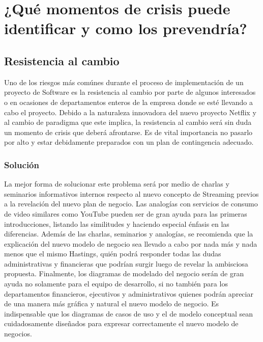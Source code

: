 \documentclass{article}
\begin{document}
\section{¿Qué momentos de crisis puede identificar y como los
prevendría?}
\subsection{Resistencia al cambio}
Uno de los riesgos más comúnes durante el proceso de implementación
de un proyecto de Software es la resistencia al cambio por parte
de algunos interesados o en ocasiones de departamentos enteros
de la empresa donde se esté llevando a cabo el proyecto. Debido
a la naturaleza innovadora del nuevo proyecto Netflix y al cambio
de paradigma que este implica, la resistencia al cambio será sin
duda un momento de crisis que deberá afrontarse. Es de vital
importancia no pasarlo por alto y estar debidamente preparados con
un plan de contingencia adecuado.
\subsubsection{Solución}
La mejor forma de solucionar este problema será por medio de 
charlas y seminarios informativos internos respecto al nuevo 
concepto de Streaming previos a la revelación del nuevo plan de
negocio. Las analogías con servicios de consumo de video similares 
como YouTube pueden ser de gran ayuda para las primeras
introducciones, listando las similitudes y 
haciendo especial énfasis en las diferencias. Además de las charlas,
seminarios y analogías, se recomienda que la explicación del nuevo
modelo de negocio sea llevado a cabo por nada más y nada menos
que el mismo Hastings, quién podrá responder todas las dudas
administrativas y financieras que podrían surgir luego de revelar
la ambisciosa propuesta. Finalmente, los diagramas de modelado
del negocio serán de gran ayuda no solamente para el equipo de 
desarrollo, si no también para los departamentos financieros,
ejecutivos y administrativos quienes podrán apreciar de una manera
más gráfica y natural el nuevo modelo de negocio. Es indispensable
que los diagramas de casos de uso y el de modelo conceptual sean 
cuidadosamente diseñados para expresar correctamente el nuevo 
modelo de negocios.
\end{document}
